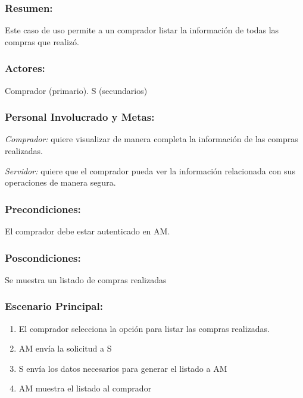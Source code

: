 \begin{framed}


\subsubsection{Resumen:} Este caso de uso permite a un comprador listar la información de todas las compras que realizó.


\subsubsection{Actores:} Comprador (primario). S (secundarios)

\subsubsection{Personal Involucrado y Metas:}

\emph{Comprador:} quiere visualizar de manera completa la información de las compras realizadas.

\emph{Servidor:} quiere que el comprador pueda ver la información relacionada con sus operaciones de manera segura.


\subsubsection{Precondiciones:} 
El comprador debe estar autenticado en AM.

\subsubsection{Poscondiciones:} 
Se muestra un listado de compras realizadas

\subsubsection{Escenario Principal: }

\begin{enumerate}
    \item El comprador selecciona la opción para listar las compras realizadas.  
    \item AM envía la solicitud a S
    \item S envía los datos necesarios para generar el listado a AM
    \item AM muestra el listado al comprador
    
\end{enumerate}


\end{framed}
